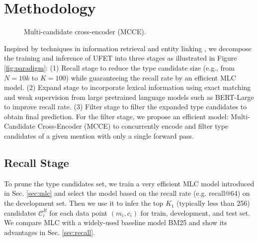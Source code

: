 \section{Methodology}
\begin{figure}[t]
    \centering
    \caption{Multi-candidate cross-encoder (MCCE).}
    \label{fig:ccf}
\end{figure}
Inspired by techniques in information retrieval \cite{ir} and entity linking \cite{wu2019zero}, we decompose the training and inference of UFET into three stages as illustrated in Figure \ref{fig:paradigm}: (1) Recall stage to reduce the type candidate size (e.g., from $N=10k$ to $K=100$) while guaranteeing the recall rate by an efficient MLC model. (2) Expand stage to incorporate lexical information using exact matching and weak supervision \cite{mlmet} from large pretrained language models such as BERT-Large \cite{bert} to improve recall rate. (3) Filter stage to filter the expanded type candidates to obtain final prediction. For the filter stage, we propose an efficient model: Multi-Candidate Cross-Encoder (MCCE) to concurrently encode and filter type candidates of a given mention with only a single forward pass. 
\subsection{Recall Stage}
To prune the type candidates set, we train a very efficient MLC model introduced in Sec. \ref{sec:mlc} and select the model based on the recall rate (e.g. recall@64) on the development set. Then we use it to infer the top $K_1$ (typically less than 256) candidates $\mathcal{C}_i^R$ for each data point $(m_i, c_i)$ for train, development, and test set. We compare MLC with a widely-used baseline model BM25 \cite{bm25} and show its advantages in Sec. \ref{sec:recall}. 
